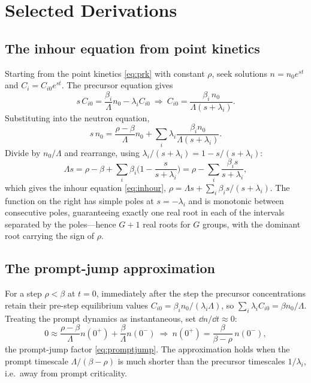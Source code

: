 \chapter{Selected Derivations}
\label{app:deriv}

\section{The inhour equation from point kinetics}

Starting from the point kinetics \eqref{eq:prk} with constant $\rho$, seek
solutions $n=n_0e^{st}$ and $C_i=C_{i0}e^{st}$. The precursor equation gives
\begin{equation}
s\,C_{i0} = \frac{\beta_i}{\Lambda}n_0 - \lambda_i C_{i0}
\ \Rightarrow\
C_{i0} = \frac{\beta_i\,n_0}{\Lambda(s+\lambda_i)}.
\end{equation}
Substituting into the neutron equation,
\begin{equation}
s\,n_0 = \frac{\rho-\beta}{\Lambda}n_0
        + \sum_i \lambda_i \frac{\beta_i n_0}{\Lambda(s+\lambda_i)}.
\end{equation}
Divide by $n_0/\Lambda$ and rearrange, using
$\lambda_i/(s+\lambda_i) = 1 - s/(s+\lambda_i)$:
\begin{equation}
\Lambda s = \rho - \beta + \sum_i \beta_i\Big(1-\frac{s}{s+\lambda_i}\Big)
          = \rho - \sum_i \frac{\beta_i s}{s+\lambda_i},
\end{equation}
which gives the inhour equation \eqref{eq:inhour},
\(
\rho = \Lambda s + \sum_i \beta_i s/(s+\lambda_i).
\)
The function on the right has simple poles at $s=-\lambda_i$ and is monotonic
between consecutive poles, guaranteeing exactly one real root in each of the
intervals separated by the poles---hence $G+1$ real roots for $G$ groups, with the
dominant root carrying the sign of $\rho$.

\section{The prompt-jump approximation}

For a step $\rho<\beta$ at $t=0$, immediately after the step the precursor
concentrations retain their pre-step equilibrium values $C_{i0}=\beta_i
n_{0}/(\lambda_i\Lambda)$, so $\sum_i\lambda_i C_{i0}=\beta n_{0}/\Lambda$.
Treating the prompt dynamics as instantaneous, set $\dd n/\dd t\approx 0$:
\begin{equation}
0 \approx \frac{\rho-\beta}{\Lambda}n(0^+) + \frac{\beta}{\Lambda}n(0^-)
\ \Rightarrow\
n(0^+) = \frac{\beta}{\beta-\rho}\,n(0^-),
\end{equation}
the prompt-jump factor \eqref{eq:promptjump}. The approximation holds when the
prompt timescale $\Lambda/(\beta-\rho)$ is much shorter than the precursor
timescales $1/\lambda_i$, i.e.\ away from prompt criticality.

